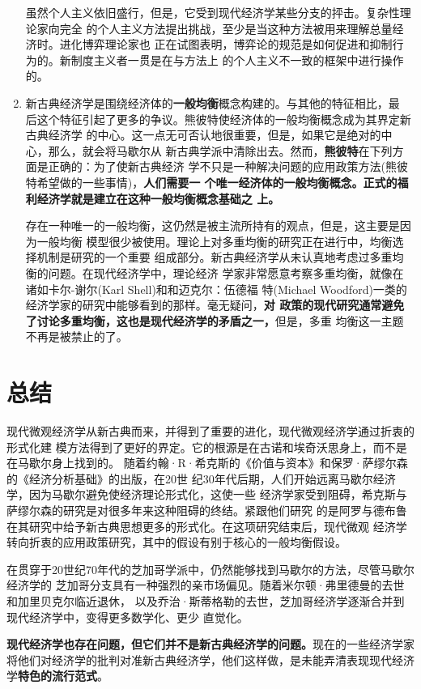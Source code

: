 \begin{enumerate}
  虽然个人主义依旧盛行，但是，它受到现代经济学某些分支的抨击。复杂性理论家向完全
  的个人主义方法提出挑战，至少是当这种方法被用来理解总量经济时。进化博弈理论家也
  正在试图表明，博弈论的规范是如何促进和抑制行为的。新制度主义者一贯是在与方法上
  的个人主义不一致的框架中进行操作的。

\item 新古典经济学是围绕经济体的\textbf{一般均衡}概念构建的。与其他的特征相比，最
  后这个特征引起了更多的争议。熊彼特使经济体的一般均衡概念成为其界定新古典经济学
  的中心。这一点无可否认地很重要，但是，如果它是绝对的中心，那么，就会将马歇尔从
  新古典学派中清除出去。然而，\textbf{熊彼特}在下列方面是正确的：为了使新古典经济
  学不只是一种解决问题的应用政策方法(熊彼特希望做的一些事情)，\textbf{人们需要一
    个唯一经济体的一般均衡概念。正式的福利经济学就是建立在这种一般均衡概念基础之
    上。}

  存在一种唯一的一般均衡，这仍然是被主流所持有的观点，但是，这主要是因为一般均衡
  模型很少被使用。理论上对多重均衡的研究正在进行中，均衡选择机制是研究的一个重要
  组成部分。新古典经济学从未认真地考虑过多重均衡的问题。在现代经济学中，理论经济
  学家非常愿意考察多重均衡，就像在诸如卡尔-谢尔(Karl Shell)和和迈克尔：伍德福
  特(Michael Woodford)一类的经济学家的研究中能够看到的那样。毫无疑问，\textbf{对
    政策的现代研究通常避免了讨论多重均衡，这也是现代经济学的矛盾之一，}但是，多重
  均衡这一主题不再是被禁止的了。
\end{enumerate}

\section{总结}

现代微观经济学从新古典而来，并得到了重要的进化，现代微观经济学通过折衷的形式化建
模方法得到了更好的界定。它的根源是在古诺和埃奇沃思身上，而不是在马歇尔身上找到的。
随着约翰·R·希克斯的《价值与资本》和保罗·萨缪尔森的《经济分析基础》的出版，在20世
纪30年代后期，人们开始远离马歇尔经济学，因为马歇尔避免使经济理论形式化，这使一些
经济学家受到阻碍，希克斯与萨缪尔森的研究是对很多年来这种阻碍的终结。紧跟他们研究
的是阿罗与德布鲁在其研究中给予新古典思想更多的形式化。在这项研究结束后，现代微观
经济学转向折衷的应用政策研究，其中的假设有别于核心的一般均衡假设。

在贯穿于20世纪70年代的芝加哥学派中，仍然能够找到马歇尔的方法，尽管马歇尔经济学的
芝加哥分支具有一种强烈的亲市场偏见。随着米尔顿·弗里德曼的去世和加里贝克尔临近退休，
以及乔治·斯蒂格勒的去世，芝加哥经济学逐渐合并到现代经济学中，变得更多数学化、更少
直觉化。

\textbf{现代经济学也存在问题，但它们并不是新古典经济学的问题。}现在的一些经济学家
将他们对经济学的批判对准新古典经济学，他们这样做，是未能弄清表现现代经济
学\textbf{特色的流行范式}。


